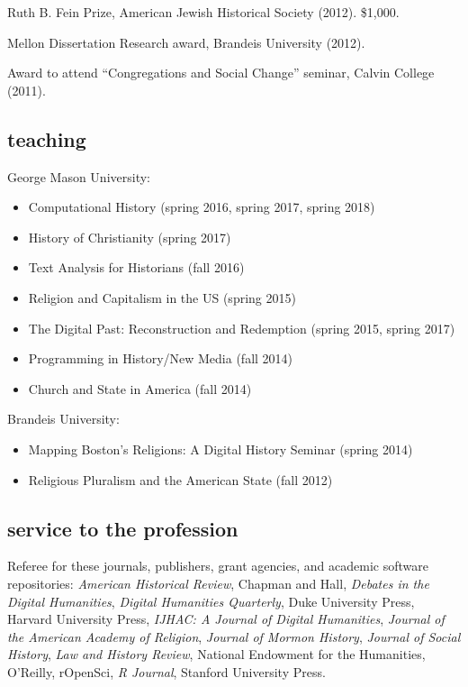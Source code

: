 \documentclass[11pt]{article}
\providecommand{\tightlist}{%
  \setlength{\itemsep}{0pt}\setlength{\parskip}{0pt}}
\begin{document}
Ruth B. Fein Prize, American Jewish Historical Society (2012). \$1,000.

Mellon Dissertation Research award, Brandeis University (2012).

Award to attend ``Congregations and Social Change'' seminar, Calvin College 
(2011).

\subsection{teaching}\label{teaching}

George Mason University:

\vspace{-0.15in}

\begin{itemize}
    \tightlist
  \item Computational History (spring 2016, spring 2017, spring 2018)
  \item History of Christianity (spring 2017)
  \item Text Analysis for Historians (fall 2016)
  \item Religion and Capitalism in the US (spring 2015) 
  \item The Digital Past: Reconstruction and Redemption (spring 2015, spring 2017)
  \item Programming in History/New Media (fall 2014) 
  \item Church and State in America (fall 2014)
\end{itemize}

\vspace{-0.1in}

Brandeis University:

\vspace{-0.15in}

\begin{itemize}
    \tightlist
  \item
    Mapping Boston's Religions: A Digital History Seminar (spring 2014)
  \item
    Religious Pluralism and the American State (fall 2012)
\end{itemize}

\subsection{service to the profession}\label{service-profession}

Referee for these journals, publishers, grant agencies, and academic software 
repositories: \emph{American Historical Review}, Chapman and Hall, 
\emph{Debates in the Digital Humanities}, \emph{Digital Humanities Quarterly}, 
Duke University Press, Harvard University Press, \emph{IJHAC: A Journal of 
  Digital Humanities}, \emph{Journal of the American Academy of Religion}, 
\emph{Journal of Mormon History}, \emph{Journal of Social History}, \emph{Law 
  and History Review}, National Endowment for the Humanities, O'Reilly, 
rOpenSci, \emph{R Journal}, Stanford University Press.
\end{document}
